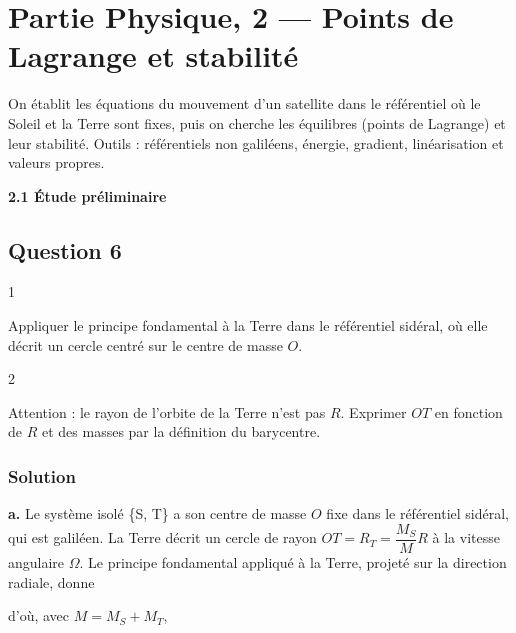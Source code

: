 \documentclass[11pt,a4paper]{article}
\newcommand{\equationajustee}[1]{%
  \sbox{\boiteequation}{$\displaystyle #1$}%
  \ifdim\wd\boiteequation>\linewidth
    \[\resizebox{\linewidth}{!}{\usebox{\boiteequation}}\]%
  \else
    \[#1\]%
  \fi}
\begin{document}
\hypertarget{partie-physique-2-points-de-lagrange-et-stabilituxe9}{%
\section{Partie Physique, 2 --- Points de Lagrange et stabilité}\label{partie-physique-2-points-de-lagrange-et-stabilituxe9}}

On établit les équations du mouvement d'un satellite dans le référentiel où le Soleil et la Terre sont fixes, puis on cherche les équilibres (points de Lagrange) et leur stabilité. Outils : référentiels non galiléens, énergie, gradient, linéarisation et valeurs propres.

\textbf{2.1 Étude préliminaire}

\hypertarget{question-6}{%
\subsection{Question 6}\label{question-6}}

\begin{indication}{1}

Appliquer le principe fondamental à la Terre dans le référentiel sidéral, où elle décrit un cercle centré sur le centre de masse \(O\).

\end{indication}

\begin{indication}{2}

Attention : le rayon de l'orbite de la Terre n'est pas \(R\). Exprimer \(OT\) en fonction de \(R\) et des masses par la définition du barycentre.

\end{indication}

\hypertarget{solution-5}{%
\subsubsection{Solution}\label{solution-5}}

\textbf{a.} Le système isolé \{S, T\} a son centre de masse \(O\) fixe dans le référentiel sidéral, qui est galiléen. La Terre décrit un cercle de rayon \(OT=R_T=\dfrac{M_S}{M}R\) à la vitesse angulaire \(\Omega\). Le principe fondamental appliqué à la Terre, projeté sur la direction radiale, donne

\equationajustee{M_T\,\Omega^2\,\frac{M_S}{M}R=\frac{GM_SM_T}{R^2},}

d'où, avec \(M=M_S+M_T\),
\end{document}
